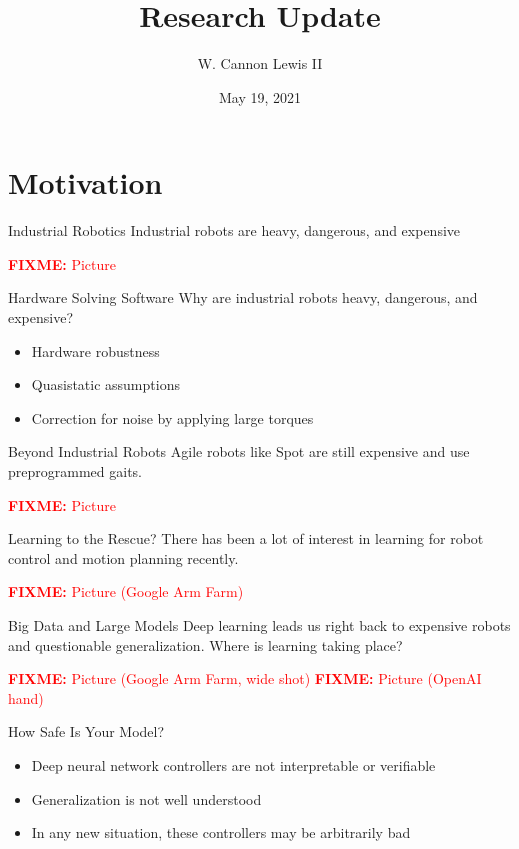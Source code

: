\documentclass{beamer}
\title{Research Update}
\author{W. Cannon Lewis II}
\date{May 19, 2021}
\newcommand\fixme[2][FIXME]{\textcolor{red}{\textbf{#1:} #2}}
\begin{document}
\begin{frame}
  \titlepage
\end{frame}

\section{Motivation}

\begin{frame}{Industrial Robotics}
  Industrial robots are heavy, dangerous, and expensive

  \fixme{Picture}
\end{frame}

\begin{frame}{Hardware Solving Software}
  Why are industrial robots heavy, dangerous, and expensive? 
  \begin{itemize}
    \item Hardware robustness
    \item Quasistatic assumptions
    \item Correction for noise by applying large torques
  \end{itemize}
\end{frame}

\begin{frame}{Beyond Industrial Robots}
  Agile robots like Spot are still expensive and use preprogrammed gaits.

  \fixme{Picture}
\end{frame}

\begin{frame}{Learning to the Rescue?}
  There has been a lot of interest in learning for robot control and motion
  planning recently.

  \fixme{Picture (Google Arm Farm)}
\end{frame}

\begin{frame}{Big Data and Large Models}
  Deep learning leads us right back to expensive robots and questionable
  generalization. Where is learning taking place?

  \fixme{Picture (Google Arm Farm, wide shot)}
  \fixme{Picture (OpenAI hand)}
\end{frame}

\begin{frame}{How Safe Is Your Model?}
  \begin{itemize}
    \item Deep neural network controllers are not interpretable or verifiable
    \item Generalization is not well understood
    \item In any new situation, these controllers may be arbitrarily bad
  \end{itemize}
\end{frame}
\end{document}
